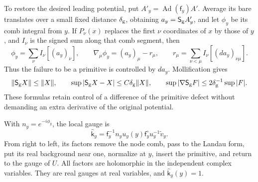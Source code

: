 \documentclass[11pt,letterpaper,reqno]{amsart}
\theoremstyle{definition}
\theoremstyle{remark}
\begin{document}
To restore the desired leading potential, put
\(A'_y=\operatorname{Ad}(\mathsf f_y)A'\).
Average its bare translates over a small fixed
distance \(\delta_{\rm g}\), obtaining
\(a_y=\mathsf S_{\rm g}A'_y\), and let \(\phi_y\)
be its comb integral from \(y\). If \(P_\nu(x)\)
replaces the first \(\nu\) coordinates of \(x\)
by those of \(y\), and \(I_\nu\) is the signed
sum along that comb segment, then
\[
 \phi_y=\sum_\nu I_\nu[(a_y)_\nu],\qquad
 \nabla_\mu\phi_y=(a_y)_\mu-r_\mu,\qquad
 r_\mu=\sum_{\nu<\mu}I_\nu[(da_y)_{\nu\mu}].
\]
Thus the failure to be a primitive is controlled
by \(da_y\). Mollification gives
\[
 \|\mathsf S_{\rm g}X\|\le\|X\|,\qquad
 \sup|\mathsf S_{\rm g}X-X|\le C\delta_{\rm g}\|X\|,
 \qquad
 \sup|\nabla\mathsf S_{\rm g}F|
                           \le2\delta_{\rm g}^{-1}\sup|F|.
\]
These formulas retain control of a difference of
the primitive defect without demanding an extra
derivative of the original potential.

With \(n_y=e^{-i\phi_y}\), the local gauge is
\[
 \widehat{\mathsf k}_y
   =\mathsf f_y^{-1}n_yu_y(y)\mathsf f_y^\circ
                                  u_y^{-1}\widetilde v_y .
\]
From right to left, its factors remove the node
comb, pass to the Landau form, put its real
background near one, normalize at \(y\), insert
the primitive, and return to the gauge of \(U\).
All factors are holomorphic in the independent
complex variables. They are real gauges at
real variables, and
\(\widehat{\mathsf k}_y(y)=1\).
\end{document}

